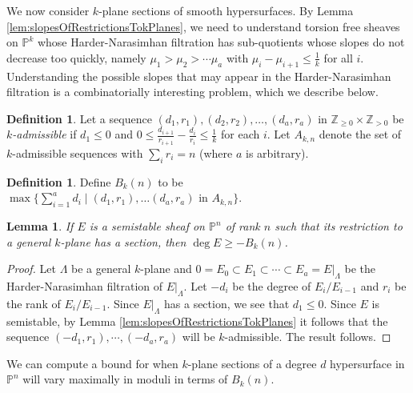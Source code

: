 \documentclass[11pt,reqno]{amsart}
\theoremstyle{plain}
\newtheorem{proposition}[theorem]{Proposition}
\newtheorem{lemma}[theorem]{Lemma}
\theoremstyle{definition}
\newtheorem{definition}[theorem]{Definition}
\theoremstyle{remark}
\numberwithin{equation}{section}
\numberwithin{equation}{section}
\newcommand{\PP}{\mathbb{P}}
\begin{document}
We now consider $k$-plane sections of smooth hypersurfaces. By Lemma \ref{lem:slopesOfRestrictionsTokPlanes}, we need to understand torsion free sheaves on $\PP^k$ whose Harder-Narasimhan filtration has sub-quotients whose slopes do not decrease too quickly, namely $\mu_1>\mu_2>\cdots\mu_a$ with $\mu_{i}-\mu_{i+1}\leq \frac{1}{k}$ for all $i$. Understanding the possible slopes that may appear in the Harder-Narasimhan filtration is a combinatorially interesting problem, which we describe below.


\begin{definition}
Let a sequence $(d_1,r_1),(d_2,r_2),\ldots, (d_a,r_a)$ in $\mathbb{Z}_{\geq 0}\times \mathbb{Z}_{>0}$ be \emph{$k$-admissible} if $d_1\leq 0$ and $0\leq \frac{d_{i+1}}{r_{i+1}}-\frac{d_i}{r_i}\leq \frac{1}{k}$ for each $i$. Let $A_{k,n}$ denote the set of $k$-admissible sequences with $\sum_{i} r_i=n$ (where $a$ is arbitrary).
\end{definition}
\begin{definition}
 Define $B_k(n)$ to be $\max\{\sum_{i=1}^{a}{d_i}\mid (d_1,r_1),\ldots(d_a,r_a)\text{ in }A_{k,n}\}$.
\end{definition}

\begin{lemma}
\label{lem:PhikrelationtoDegree}
If $E$ is a semistable sheaf on $\PP^n$ of rank $n$ such that its restriction to a general $k$-plane has a section, then $\deg E \geq -B_k(n)$.
\end{lemma}
\begin{proof}
Let $\Lambda$ be a general $k$-plane and $0 = E_0 \subset E_1 \subset \cdots \subset E_a = E|_{\Lambda}$ be the Harder-Narasimhan filtration of $E|_{\Lambda}$. Let $-d_i$ be the degree of $E_i/E_{i-1}$ and $r_i$ be the rank of $E_i/E_{i-1}$. Since $E|_{\Lambda}$ has a section, we see that $d_1 \leq 0$. Since $E$ is semistable, by Lemma \ref{lem:slopesOfRestrictionsTokPlanes} it follows that the sequence $(-d_1,r_1), \cdots, (-d_a,r_a)$ will be $k$-admissible. The result follows.
\end{proof}
We can compute a bound for when $k$-plane sections of a degree $d$ hypersurface in $\PP^n$ will vary maximally in moduli in terms of $B_k(n)$.
\end{document}
